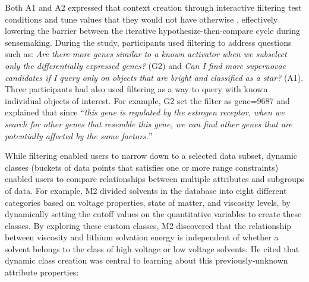  \par Both A1 and A2 expressed that context creation through interactive filtering  test conditions and tune values that they would not have otherwise , effectively lowering the barrier between the iterative hypothesize-then-compare cycle during sensemaking.
 During the study, participants used filtering
 to address questions such as:
 \textit{Are there more genes similar
 to a known activator when we subselect
 only the differentially expressed genes?} (G2) and \textit{Can I find more supernovae candidates if I query only on objects that are bright and classified as a star?} (A1). Three participants had also used filtering as a way to query with known individual objects of interest. For example, G2 set the filter as gene=9687 and explained that since ``\textit{this gene is regulated by the estrogen receptor, when we search for other genes that resemble this gene, we can find other genes that are potentially affected by the same factors.}''
 \par While filtering enabled users to
 narrow down to a selected data subset,
 dynamic classes (buckets of data points that satisfies one or more range constraints) enabled users to compare
 relationships between multiple attributes and subgroups of data.
 For example, M2 divided solvents in the database
 into eight different categories based on voltage properties,
 state of matter, and viscosity levels,
 by dynamically setting the cutoff values
 on the quantitative variables to create these classes.
 By exploring these custom classes, M2 discovered that the relationship between viscosity and lithium solvation energy is independent of whether a solvent belongs to the class of high voltage or low voltage solvents. He cited that dynamic class creation was central to learning about this previously-unknown attribute properties:
